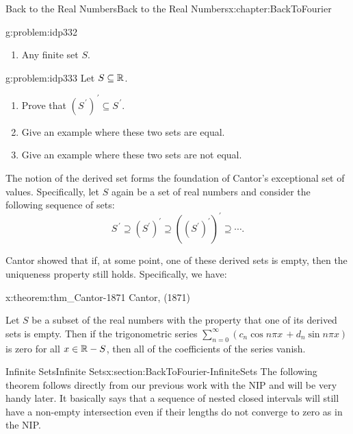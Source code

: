 \begin{chapterptx}{Back to the Real Numbers}{}{Back to the Real Numbers}{}{}{x:chapter:BackToFourier}
\begin{introduction}{}
\begin{problem}{}{g:problem:idp332}
\begin{enumerate}[label=(\alph*)]
				\item{}Any finite set \(S\).%
			\end{enumerate}
		\end{problem}
		\begin{problem}{}{g:problem:idp333}%
			 Let \(S\subseteq\mathbb {R}\).%
			\begin{enumerate}[label=(\alph*)]
				\item{}Prove that \(\left(S^{\,\prime}\right)^{\,\prime}\subseteq S^{\,\prime}\).%
				\item{}Give an example where these two sets are equal.%
				\item{}Give an example where these two sets are not equal.%
			\end{enumerate}
		\end{problem}
		The notion of the derived set forms the foundation of Cantor's exceptional set of values. Specifically, let \(S\) again be a set of real numbers and consider the following sequence of sets:%
		\begin{equation*}
			S^{\,\prime}\supseteq \left(S^\prime\right)^\prime\supseteq \left(\left(S^\prime\right)^\prime\right)^\prime\supseteq \cdots\text{.}
		\end{equation*}
		\par
		Cantor  showed that if, at some point, one of these derived sets is empty, then the uniqueness property still holds. Specifically, we have:%
		\begin{theorem}{}{}{x:theorem:thm_Cantor-1871}%
			\alert{Cantor, (1871)}%
			\par
			 Let \(S\) be a subset of the real numbers with the property that one of its derived sets is empty.  Then if the trigonometric series \(\sum_{n=0}^\infty\left(c_n\cos n\pi
			x\,+d_n\sin n\pi x\right)\) is zero for all \(x\in\mathbb {R}-S\), then all of the coefficients of the series vanish.%
		\end{theorem}
	\end{introduction}%
	\typeout{************************************************}
	\typeout{************************************************}
	\begin{sectionptx}{Infinite Sets}{}{Infinite Sets}{}{}{x:section:BackToFourier-InfiniteSets}
		The following theorem follows directly from our previous work with the NIP and will be very handy later. It basically says that a sequence of nested closed intervals will still have a non-empty intersection even if their lengths do not converge to zero as in the NIP.%

\end{sectionptx}
\end{chapterptx}
